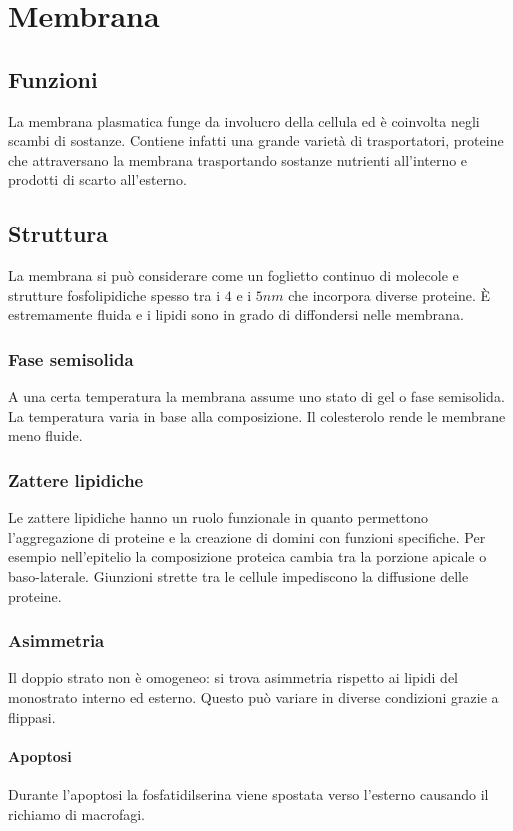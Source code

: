\chapter{Membrana}

\section{Funzioni}
La membrana plasmatica funge da involucro della cellula ed \`e coinvolta negli scambi di sostanze.
Contiene infatti una grande variet\`a di trasportatori, proteine che attraversano la membrana trasportando sostanze nutrienti all'interno e prodotti di scarto all'esterno.

\section{Struttura}
La membrana si pu\`o considerare come un foglietto continuo di molecole e strutture fosfolipidiche spesso tra i $4$ e i $5nm$ che incorpora diverse proteine.
\`E estremamente fluida e i lipidi sono in grado di diffondersi nelle membrana.

	\subsection{Fase semisolida}
	A una certa temperatura la membrana assume uno stato di gel o fase semisolida.
	La temperatura varia in base alla composizione.
	Il colesterolo rende le membrane meno fluide.

	\subsection{Zattere lipidiche}
	Le zattere lipidiche hanno un ruolo funzionale in quanto permettono l'aggregazione di proteine e la creazione di domini con funzioni specifiche.
	Per esempio nell'epitelio la composizione proteica cambia tra la porzione apicale o baso-laterale.
	Giunzioni strette tra le cellule impediscono la diffusione delle proteine.

	\subsection{Asimmetria}
	Il doppio strato non \`e omogeneo: si trova asimmetria rispetto ai lipidi del monostrato interno ed esterno.
	Questo pu\`o variare in diverse condizioni grazie a flippasi.
	
		\subsubsection{Apoptosi}
		Durante l'apoptosi la fosfatidilserina viene spostata verso l'esterno causando il richiamo di macrofagi.

